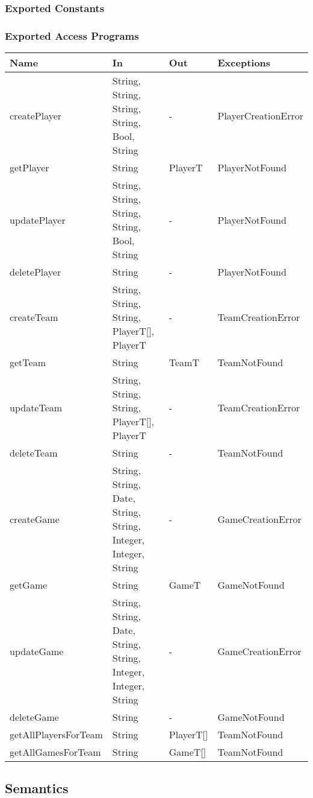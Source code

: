 \documentclass[12pt, titlepage]{article}
\begin{document}
\subsubsection{Exported Constants}

\subsubsection{Exported Access Programs}

\begin{center}
  \begin{tabular}{|p{4cm}| p{4cm}| p{4cm} | p{3cm}|}
  \hline
  \textbf{Name} & \textbf{In} & \textbf{Out} & \textbf{Exceptions} \\
  \hline
  createPlayer & String, String, String, String, Bool, String & - & PlayerCreationError \\
  getPlayer & String & PlayerT & PlayerNotFound \\
  updatePlayer & String, String, String, String, Bool, String & - & PlayerNotFound \\
  deletePlayer & String & - & PlayerNotFound \\
  createTeam & String, String, String, PlayerT[], PlayerT & - & TeamCreationError \\
  getTeam & String & TeamT & TeamNotFound \\
  updateTeam & String, String, String, PlayerT[], PlayerT & - & TeamCreationError \\
  deleteTeam & String & - & TeamNotFound \\
  createGame & String, String, Date, String, String, Integer, Integer, String & - & GameCreationError \\
  getGame & String & GameT & GameNotFound \\
  updateGame & String, String, Date, String, String, Integer, Integer, String & - & GameCreationError \\
  deleteGame & String & - & GameNotFound \\
  getAllPlayersForTeam & String & PlayerT[] & TeamNotFound \\
  getAllGamesForTeam & String & GameT[] & TeamNotFound \\
  \hline
  \end{tabular}
\end{center}

\subsection{Semantics}
\end{document}
